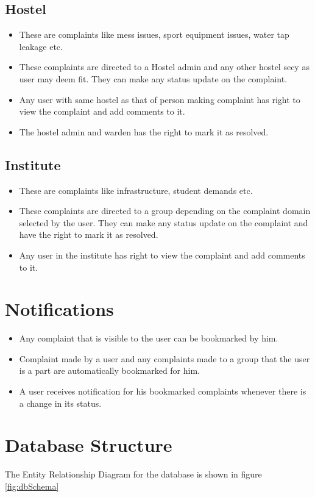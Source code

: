 \documentclass[12pt]{article}
\begin{document}
\subsection{Hostel}
\begin{itemize}
\setlength\itemsep{-0.4em}
\item These are complaints like mess issues, sport equipment issues, water tap leakage etc.
\item These complaints are directed to a Hostel admin and any other hostel secy as user may deem fit. They can make any status update on the complaint.
\item Any user with same hostel as that of person making complaint has right to view the complaint and add comments to it.
\item The hostel admin and warden has the right to mark it as resolved.
\end{itemize}
\subsection{Institute}
\begin{itemize}
\setlength\itemsep{-0.4em}
\item These are complaints like infrastructure, student demands etc.
\item These complaints are directed to a group depending on the complaint domain selected by the user. They can make any status update on the complaint and have the right to mark it as resolved.
\item Any user in the institute has right to view the complaint and add comments to it.
\end{itemize}

\section{Notifications}
\begin{itemize}
\setlength\itemsep{-0.4em}
\item Any complaint that is visible to the user can be bookmarked by him.
\item Complaint made by a user and any complaints made to a group that the user is a part are automatically bookmarked for him.
\item A user receives notification for his bookmarked complaints whenever there is a change in its status.
\end{itemize}

\newpage

\section{Database Structure}
The Entity Relationship Diagram for the database is shown in figure \ref{fig:dbSchema}
\end{document}
